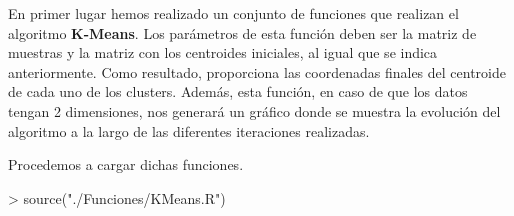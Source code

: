 \documentclass [a4paper] {article}
\begin{document}
\bigskip
En primer lugar hemos realizado un conjunto de funciones que realizan el algoritmo \textbf{K-Means}. Los parámetros
de esta función deben ser la matriz de muestras y la matriz con los centroides iniciales, al igual que se indica 
anteriormente. Como resultado, proporciona las coordenadas finales del centroide de cada uno de los clusters.
Además, esta función, en caso de que los datos tengan 2 dimensiones, nos generará un gráfico donde se muestra la 
evolución del algoritmo a la largo de las diferentes iteraciones realizadas. 

\bigskip
Procedemos a cargar dichas funciones.
\begin{Schunk}
\begin{Sinput}
> source("./Funciones/KMeans.R")
\end{Sinput}
\end{Schunk}
\end{document}
